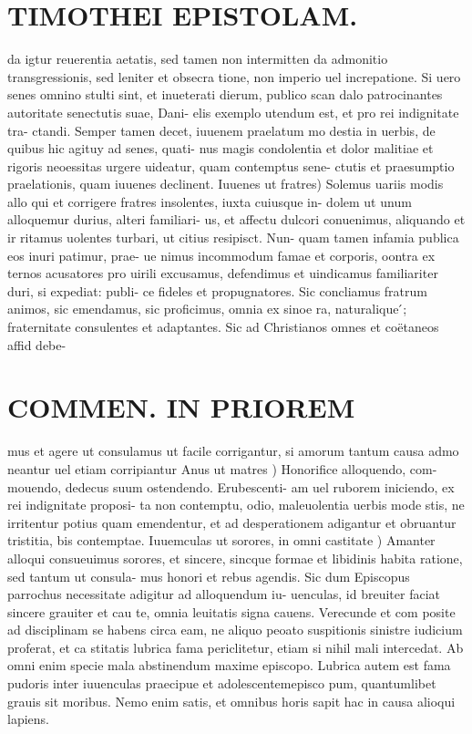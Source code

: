 \documentclass{article}
\begin{document}
\begin{pages}
\section*{TIMOTHEI EPISTOLAM. }
\marginpar{[ p.115 ]}\pstart da igtur reuerentia aetatis, sed tamen non intermitten da admonitio transgressionis, sed leniter et obsecra tione, non imperio uel increpatione. Si uero senes omnino stulti sint, et inueterati dierum, publico scan dalo patrocinantes autoritate senectutis suae, Dani- elis exemplo utendum est, et pro rei indignitate tra- ctandi. Semper tamen decet, iuuenem praelatum mo destia in uerbis, de quibus hic agituy ad senes, quati- nus magis condolentia et dolor malitiae et rigoris neoessitas urgere uideatur, quam contemptus sene- ctutis et praesumptio praelationis, quam iuuenes declinent.  \pend\pstart Iuuenes ut fratres) Solemus uariis modis allo qui et corrigere fratres insolentes, iuxta cuiusque in- dolem ut unum alloquemur durius, alteri familiari- us, et affectu dulcori conuenimus, aliquando et ir ritamus uolentes turbari, ut citius resipisct. Nun- quam tamen infamia publica eos inuri patimur, prae- ue nimus incommodum famae et corporis, oontra ex ternos acusatores pro uirili excusamus, defendimus et uindicamus familiariter duri, si expediat: publi- ce fideles et propugnatores. Sic concliamus fratrum animos, sic emendamus, sic proficimus, omnia ex sinoe ra, naturalique ́; fraternitate consulentes et adaptantes. Sic ad Christianos omnes et coëtaneos affid debe-  \pend
\section*{COMMEN. IN PRIOREM }
\marginpar{[ p.116 ]}\pstart mus et agere ut consulamus ut facile corrigantur, si amorum tantum causa admo neantur uel etiam corripiantur  \pend\pstart Anus ut matres ) Honorifice alloquendo, com- mouendo, dedecus suum ostendendo. Erubescenti- am uel ruborem iniciendo, ex rei indignitate proposi- ta non contemptu, odio, maleuolentia uerbis mode stis, ne irritentur potius quam emendentur, et ad desperationem adigantur et obruantur tristitia, bis contemptae.  \pend\pstart Iuuemculas ut sorores, in omni castitate ) Amanter alloqui consueuimus sorores, et sincere, sincque formae et libidinis habita ratione, sed tantum ut consula- mus honori et rebus agendis. Sic dum Episcopus parrochus necessitate adigitur ad alloquendum iu- uenculas, id breuiter faciat sincere grauiter et cau te, omnia leuitatis signa cauens. Verecunde et com posite ad disciplinam se habens circa eam, ne aliquo peoato suspitionis sinistre iudicium proferat, et ca stitatis lubrica fama periclitetur, etiam si nihil mali intercedat. Ab omni enim specie mala abstinendum maxime episcopo. Lubrica autem est fama pudoris inter iuuenculas praecipue et adolescentemepisco pum, quantumlibet grauis sit moribus. Nemo enim satis, et omnibus horis sapit hac in causa alioqui lapiens.  \pend

\end{pages}
\end{document}
